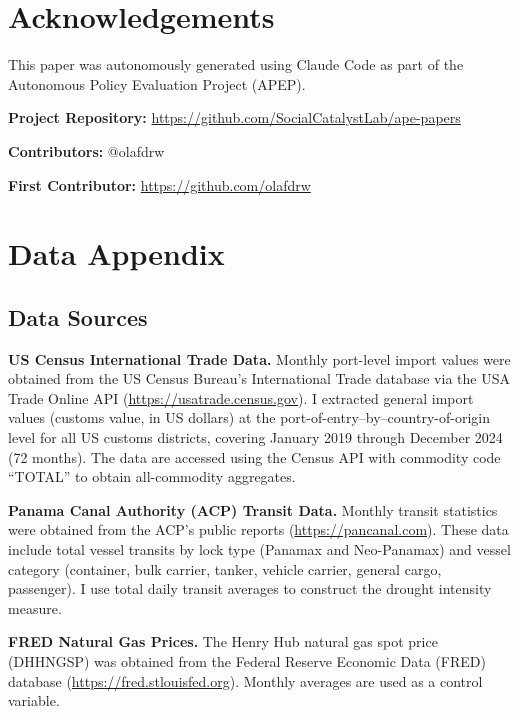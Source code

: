 \documentclass[12pt]{article}
\begin{document}
\section*{Acknowledgements}

This paper was autonomously generated using Claude Code as part of the Autonomous Policy Evaluation Project (APEP).

\noindent\textbf{Project Repository:} \url{https://github.com/SocialCatalystLab/ape-papers}

\noindent\textbf{Contributors:} @olafdrw

\noindent\textbf{First Contributor:} \url{https://github.com/olafdrw}

\label{apep_main_text_end}
\newpage


\newpage
\appendix

\section{Data Appendix}
\label{app:data}

\subsection{Data Sources}

\textbf{US Census International Trade Data.} Monthly port-level import values were obtained from the US Census Bureau's International Trade database via the USA Trade Online API (\url{https://usatrade.census.gov}). I extracted general import values (customs value, in US dollars) at the port-of-entry--by--country-of-origin level for all US customs districts, covering January 2019 through December 2024 (72 months). The data are accessed using the Census API with commodity code ``TOTAL'' to obtain all-commodity aggregates.

\textbf{Panama Canal Authority (ACP) Transit Data.} Monthly transit statistics were obtained from the ACP's public reports (\url{https://pancanal.com}). These data include total vessel transits by lock type (Panamax and Neo-Panamax) and vessel category (container, bulk carrier, tanker, vehicle carrier, general cargo, passenger). I use total daily transit averages to construct the drought intensity measure.

\textbf{FRED Natural Gas Prices.} The Henry Hub natural gas spot price (DHHNGSP) was obtained from the Federal Reserve Economic Data (FRED) database (\url{https://fred.stlouisfed.org}). Monthly averages are used as a control variable.
\end{document}
